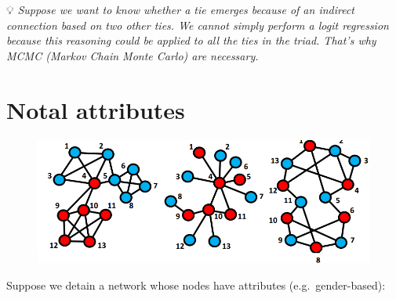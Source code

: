 \documentclass[
  notitlepage,
  onecolumn,
  openany]{book}
\begin{document}
💡 \emph{Suppose we want to know whether a tie emerges because of an indirect connection based on two other ties. We cannot simply perform a logit regression because this reasoning could be applied to all the ties in the triad. That's why MCMC (Markov Chain Monte Carlo) are necessary.}

\hypertarget{notal-attributes}{%
\section{Notal attributes}\label{notal-attributes}}

\begin{figure}[h!]

{\centering \includegraphics[width=0.5\linewidth]{images/13-ERGMs/Untitled 2} 

}

\end{figure}

Suppose we detain a network whose nodes have attributes (e.g.~gender-based):
\end{document}
